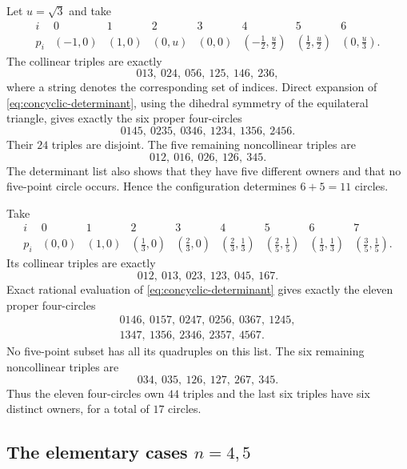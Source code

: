 \begin{construction}
\label{con:seven-upper}
Let $u=\sqrt3$ and take
\[
\begin{array}{c|ccccccc}
i&0&1&2&3&4&5&6\\ \hline
p_i&(-1,0)&(1,0)&(0,u)&(0,0)&
(-\tfrac12,\tfrac u2)&(\tfrac12,\tfrac u2)&(0,\tfrac u3).
\end{array}
\]
The collinear triples are exactly
\[
 013,\ 024,\ 056,\ 125,\ 146,\ 236,
\]
where a string denotes the corresponding set of indices.  Direct expansion
of \eqref{eq:concyclic-determinant}, using the dihedral symmetry of the
equilateral triangle, gives exactly the six proper four-circles
\[
 0145,\ 0235,\ 0346,\ 1234,\ 1356,\ 2456.
\]
Their $24$ triples are disjoint.  The five remaining noncollinear triples
are
\[
 012,\ 016,\ 026,\ 126,\ 345.
\]
The determinant list also shows that they have five different owners and
that no five-point circle occurs.  Hence the configuration determines
$6+5=11$ circles.
\end{construction}

\begin{construction}
\label{con:eight-upper}
Take
\[
\begin{array}{c|cccccccc}
i&0&1&2&3&4&5&6&7\\ \hline
p_i&(0,0)&(1,0)&(\tfrac13,0)&(\tfrac23,0)&
(\tfrac23,\tfrac13)&(\tfrac25,\tfrac15)&
(\tfrac13,\tfrac13)&(\tfrac35,\tfrac15).
\end{array}
\]
Its collinear triples are exactly
\[
 012,\ 013,\ 023,\ 123,\ 045,\ 167.
\]
Exact rational evaluation of \eqref{eq:concyclic-determinant} gives exactly
the eleven proper four-circles
\[
\begin{gathered}
0146,\ 0157,\ 0247,\ 0256,\ 0367,\ 1245,\\
1347,\ 1356,\ 2346,\ 2357,\ 4567.
\end{gathered}
\]
No five-point subset has all its quadruples on this list.  The six remaining
noncollinear triples are
\[
 034,\ 035,\ 126,\ 127,\ 267,\ 345.
\]
Thus the eleven four-circles own $44$ triples and the last six triples have
six distinct owners, for a total of $17$ circles.
\end{construction}

\subsection{The elementary cases \texorpdfstring{$n=4,5$}{n=4,5}}

